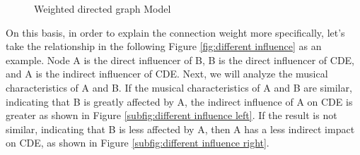 \documentclass[12pt]{article}  %
\begin{document}
\begin{figure}[htbp]
\centering
{}
\caption{Weighted directed graph Model}\label{fig:networkstructure}
\end{figure}

On this basis, in order to explain the connection weight more specifically, let's take the relationship in the following Figure \ref{fig:different influence} as an example. Node A is the direct influencer of B, B is the direct influencer of CDE, and A is the indirect influencer of CDE. Next, we will analyze the musical characteristics of A and B. If the musical characteristics of A and B are similar, indicating that B is greatly affected by A, the indirect influence of A on CDE is greater as shown in Figure \ref{subfig:different influence left}. If the result is not similar, indicating that B is less affected by A, then A has a less indirect impact on CDE, as shown in Figure \ref{subfig:different influence right}. 
\end{document}
